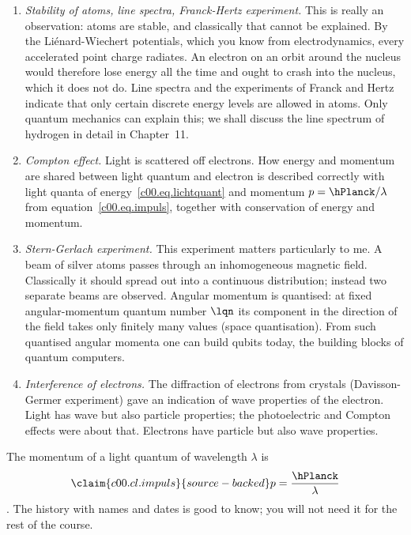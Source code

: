 \begin{enumerate}
  \item \emph{Stability of atoms, line spectra, Franck-Hertz experiment.} This is really an
    observation: atoms are stable, and classically that cannot be explained. By the
    Liénard-Wiechert potentials, which you know from electrodynamics, every accelerated point
    charge radiates. An electron on an orbit around the nucleus would therefore lose energy
    all the time and ought to crash into the nucleus, which it does not do. Line spectra and
    the experiments of Franck and Hertz indicate that only certain discrete energy levels
    are allowed in atoms. Only quantum mechanics can explain this; we shall discuss the line
    spectrum of hydrogen in detail in Chapter~11.
  \item \emph{Compton effect.} Light is scattered off electrons. How energy and momentum are
    shared between light quantum and electron is described correctly with light quanta of
    energy~\eqref{c00.eq.lichtquant} and momentum $p = \hPlanck/\lambda$ from
    equation~\eqref{c00.eq.impuls}, together with conservation of energy and momentum.
  \item \emph{Stern-Gerlach experiment.} This experiment matters particularly to me. A beam
    of silver atoms passes through an inhomogeneous magnetic field. Classically it should
    spread out into a continuous distribution; instead two separate beams are observed.
    Angular momentum is quantised: at fixed angular-momentum quantum number $\lqn$ its
    component in the direction of the field takes only finitely many values (space
    quantisation). From such quantised angular momenta one can build qubits today,
    the building blocks of quantum computers.
  \item \emph{Interference of electrons.} The diffraction of electrons from crystals
    (Davisson-Germer experiment) gave an indication of wave properties of the electron.
    Light has wave but also particle properties; the photoelectric and Compton effects were
    about that. Electrons have particle but also wave properties.
\end{enumerate}
The momentum of a light quantum of wavelength $\lambda$ is
\begin{equation}\label{c00.eq.impuls}\claim{c00.cl.impuls}{source-backed}
  p = \frac{\hPlanck}{\lambda}
\end{equation}
. The history with names and dates is
good to know; you will not need it for the rest of the course.

